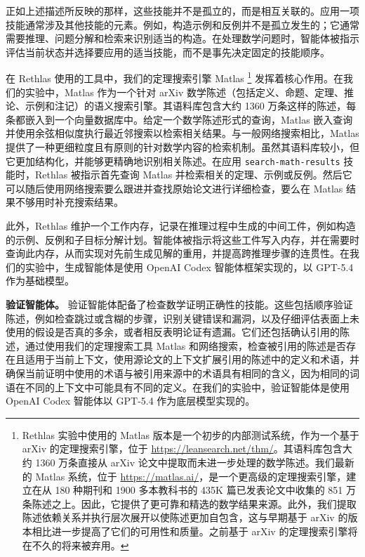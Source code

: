 \documentclass[]{pkuai4m}
\theoremstyle{plain}
\theoremstyle{definition}
\begin{document}
正如上述描述所反映的那样，这些技能并不是孤立的，而是相互关联的。应用一项技能通常涉及其他技能的元素。例如，构造示例和反例并不是孤立发生的；它通常需要推理、问题分解和检索来识别适当的构造。在处理数学问题时，智能体被指示评估当前状态并选择要应用的适当技能，而不是事先决定固定的技能顺序。

在 Rethlas 使用的工具中，我们的定理搜索引擎 Matlas \footnote{Rethlas 实验中使用的 Matlas 版本是一个初步的内部测试系统，作为一个基于 arXiv 的定理搜索引擎，位于 \href{https://leansearch.net/thm/}{https://leansearch.net/thm/}。其语料库包含大约 1360 万条直接从 arXiv 论文中提取而未进一步处理的数学陈述。我们最新的 Matlas 系统，位于 \href{https://matlas.ai/}{https://matlas.ai/}，是一个更高级的定理搜索引擎，建立在从 180 种期刊和 1900 多本教科书的 435K 篇已发表论文中收集的 851 万条陈述之上。因此，它提供了更可靠和精选的数学结果来源。此外，我们提取陈述依赖关系并执行层次展开以使陈述更加自包含，这与早期基于 arXiv 的版本相比进一步提高了它们的可用性和质量。之前基于 arXiv 的定理搜索引擎将在不久的将来被弃用。} 发挥着核心作用。在我们的实验中，Matlas 作为一个针对 arXiv 数学陈述（包括定义、命题、定理、推论、示例和注记）的语义搜索引擎。其语料库包含大约 1360 万条这样的陈述，每条都嵌入到一个向量数据库中。给定一个数学陈述形式的查询，Matlas 嵌入查询并使用余弦相似度执行最近邻搜索以检索相关结果。与一般网络搜索相比，Matlas 提供了一种更细粒度且有原则的针对数学内容的检索机制。虽然其语料库较小，但它更加结构化，并能够更精确地识别相关陈述。在应用 \texttt{search-math-results} 技能时，Rethlas 被指示首先查询 Matlas 并检索相关的定理、示例或反例。然后它可以随后使用网络搜索要么跟进并查找原始论文进行详细检查，要么在 Matlas 结果不够用时补充搜索结果。

此外，Rethlas 维护一个工作内存，记录在推理过程中生成的中间工件，例如构造的示例、反例和子目标分解计划。智能体被指示将这些工件写入内存，并在需要时查询此内存，从而实现对先前生成见解的重用，并提高跨推理步骤的连贯性。在我们的实验中，生成智能体是使用 OpenAI Codex 智能体框架实现的，以 GPT-5.4 作为基础模型。

\textbf{验证智能体。} 验证智能体配备了检查数学证明正确性的技能。这些包括顺序验证陈述，例如检查跳过或含糊的步骤，识别关键错误和漏洞，以及仔细评估表面上未使用的假设是否真的多余，或者相反表明论证有遗漏。它们还包括确认引用的陈述，通过使用我们的定理搜索工具 Matlas 和网络搜索，检查被引用的陈述是否存在且适用于当前上下文，使用源论文的上下文扩展引用的陈述中的定义和术语，并确保当前证明中使用的术语与被引用来源中的术语具有相同的含义，因为相同的词语在不同的上下文中可能具有不同的定义。在我们的实验中，验证智能体是使用 OpenAI Codex 智能体以 GPT-5.4 作为底层模型实现的。
\end{document}
